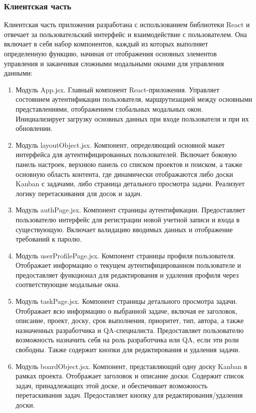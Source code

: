 \subsubsection{Клиентская часть}
Клиентская часть приложения разработана с использованием библиотеки React и отвечает за пользовательский интерфейс и взаимодействие с пользователем. Она включает в себя набор компонентов, каждый из которых выполняет определенную функцию, начиная от отображения основных элементов управления и заканчивая сложными модальными окнами для управления данными:
\begin{enumerate}
	\item Модуль App.jsx. Главный компонент React-приложения. Управляет состоянием аутентификации пользователя, маршрутизацией между основными представлениями, отображением глобальных модальных окон. Инициализирует загрузку основных данных при входе пользователя и при их обновлении.
	\item Модуль layoutObject.jsx. Компонент, определяющий основной макет интерфейса для аутентифицированных пользователей. Включает боковую панель настроек, верхнюю панель со списком проектов и поиском, а также основную область контента, где динамически отображаются либо доски Kanban с задачами, либо страница детального просмотра задачи. Реализует логику перетаскивания для досок и задач.
	\item Модуль authPage.jsx. Компонент страницы аутентификации. Предоставляет пользователю интерфейс для регистрации новой учетной записи и входа в существующую. Включает валидацию вводимых данных и отображение требований к паролю.
	\item Модуль userProfilePage.jsx. Компонент страницы профиля пользователя. Отображает информацию о текущем аутентифицированном пользователе и предоставляет функционал для редактирования и удаления профиля через соответствующие модальные окна.
	\item Модуль taskPage.jsx. Компонент страницы детального просмотра задачи. Отображает всю информацию о выбранной задаче, включая ее заголовок, описание, проект, доску, срок выполнения, приоритет, тип, автора, а также назначенных разработчика и QA-специалиста. Предоставляет пользователю возможность назначить себя на роль разработчика или QA, если эти роли свободны. Также содержит кнопки для редактирования и удаления задачи.
	\item Модуль boardObject.jsx. Компонент, представляющий одну доску Kanban в рамках проекта. Отображает заголовок и описание доски. Содержит список задач, принадлежащих этой доске, и обеспечивает возможность перетаскивания задач. Предоставляет кнопку для редактирования/удаления доски.

\end{enumerate}
